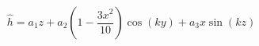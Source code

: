 $$
\hat h = a_1 z + a_2 \left(1 - \frac{3 x^{2}}{10}\right) \cos{\left(k y \right)} + a_3 x \sin{\left(k z \right)}
$$
